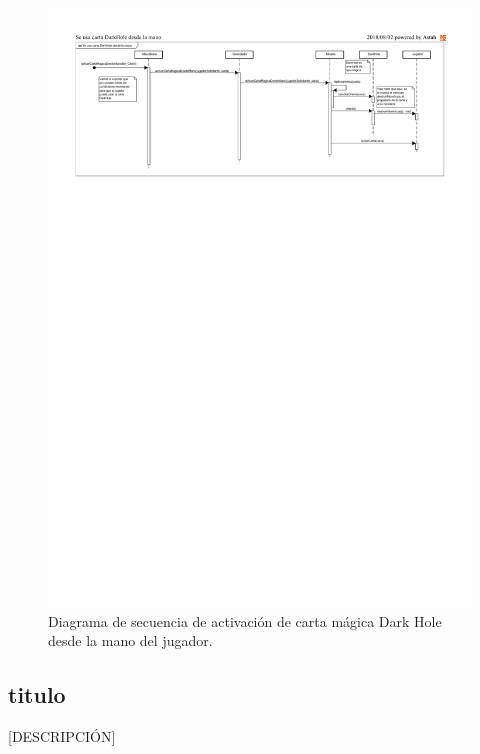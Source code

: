 \begin{figure}[H]
	\centering
	\includegraphics[scale=0.9]{includes/seq_DarkHole_desde_la_mano}
	\caption{Diagrama de secuencia de activación de carta mágica Dark Hole desde la mano del jugador.}
	\label{seq_DarkHole_desde_la_mano}
\end{figure}

\subsection{titulo}

[DESCRIPCIÓN]

